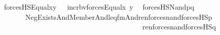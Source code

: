 \begin{isabellebody}
\ \ {\isachardoublequoteopen}forcesHS{\isacharprime}{\kern0pt}{\isacharparenleft}{\kern0pt}Equal{\isacharparenleft}{\kern0pt}x{\isacharcomma}{\kern0pt}y{\isacharparenright}{\kern0pt}{\isacharparenright}{\kern0pt}\ \ {\isacharequal}{\kern0pt}\ incr{\isacharunderscore}{\kern0pt}bv{\isacharparenleft}{\kern0pt}forces{\isacharprime}{\kern0pt}{\isacharparenleft}{\kern0pt}Equal{\isacharparenleft}{\kern0pt}x{\isacharcomma}{\kern0pt}\ y{\isacharparenright}{\kern0pt}{\isacharparenright}{\kern0pt}{\isacharparenright}{\kern0pt}{\isacharbackquote}{\kern0pt}{}{\isachardoublequoteclose}\isanewline
\ \ {\isachardoublequoteopen}forcesHS{\isacharprime}{\kern0pt}{\isacharparenleft}{\kern0pt}Nand{\isacharparenleft}{\kern0pt}p{\isacharcomma}{\kern0pt}q{\isacharparenright}{\kern0pt}{\isacharparenright}{\kern0pt}\ \ \ {\isacharequal}{\kern0pt}\isanewline
\ \ \ \ \ \ \ \ Neg{\isacharparenleft}{\kern0pt}Exists{\isacharparenleft}{\kern0pt}And{\isacharparenleft}{\kern0pt}Member{\isacharparenleft}{\kern0pt}{}{\isacharcomma}{\kern0pt}{}{\isacharparenright}{\kern0pt}{\isacharcomma}{\kern0pt}And{\isacharparenleft}{\kern0pt}leq{\isacharunderscore}{\kern0pt}fm{\isacharparenleft}{\kern0pt}{}{\isacharcomma}{\kern0pt}{}{\isacharcomma}{\kern0pt}{}{\isacharparenright}{\kern0pt}{\isacharcomma}{\kern0pt}And{\isacharparenleft}{\kern0pt}ren{\isacharunderscore}{\kern0pt}forces{\isacharunderscore}{\kern0pt}nand{\isacharparenleft}{\kern0pt}forcesHS{\isacharprime}{\kern0pt}{\isacharparenleft}{\kern0pt}p{\isacharparenright}{\kern0pt}{\isacharparenright}{\kern0pt}{\isacharcomma}{\kern0pt}\isanewline
\ \ \ \ \ \ \ \ \ \ \ \ \ \ \ \ \ \ \ \ \ \ \ \ \ \ \ \ \ \ \ \ \ \ \ \ \ \ \ \ \ ren{\isacharunderscore}{\kern0pt}forces{\isacharunderscore}{\kern0pt}nand{\isacharparenleft}{\kern0pt}forcesHS{\isacharprime}{\kern0pt}{\isacharparenleft}{\kern0pt}q{\isacharparenright}{\kern0pt}{\isacharparenright}{\kern0pt}{\isacharparenright}{\kern0pt}{\isacharparenright}{\kern0pt}{\isacharparenright}{\kern0pt}{\isacharparenright}{\kern0pt}{\isacharparenright}{\kern0pt}{\isachardoublequoteclose}\isanewline

\end{isabellebody}
